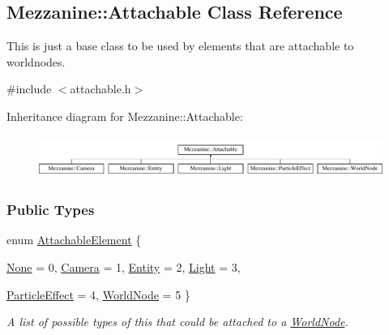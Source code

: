 \hypertarget{classMezzanine_1_1Attachable}{
\subsection{Mezzanine::Attachable Class Reference}
\label{classMezzanine_1_1Attachable}
}


This is just a base class to be used by elements that are attachable to worldnodes.  




{\ttfamily \#include $<$attachable.h$>$}

Inheritance diagram for Mezzanine::Attachable:\begin{figure}[H]
\begin{center}
\leavevmode
\includegraphics[height=1.374233cm]{classMezzanine_1_1Attachable}
\end{center}
\end{figure}
\subsubsection*{Public Types}
\begin{DoxyCompactItemize}
\item 
enum \hyperlink{classMezzanine_1_1Attachable_a274bd45f9666f6e50f6fdd8a0162bc9e}{AttachableElement} \{ \par
\hyperlink{classMezzanine_1_1Attachable_a274bd45f9666f6e50f6fdd8a0162bc9ea7bdda11851ee5269f96ed56c1759de24}{None} =  0, 
\hyperlink{classMezzanine_1_1Attachable_a274bd45f9666f6e50f6fdd8a0162bc9ea6f00000af91736e964c4e9c5ef4089b0}{Camera} =  1, 
\hyperlink{classMezzanine_1_1Attachable_a274bd45f9666f6e50f6fdd8a0162bc9ea0879ad765016bddb95723e99b1526cf4}{Entity} =  2, 
\hyperlink{classMezzanine_1_1Attachable_a274bd45f9666f6e50f6fdd8a0162bc9ea1e169d7d694a091e31c6b59f18841e16}{Light} =  3, 
\par
\hyperlink{classMezzanine_1_1Attachable_a274bd45f9666f6e50f6fdd8a0162bc9ea34203e4c067e9f503fcf9d90a4171397}{ParticleEffect} =  4, 
\hyperlink{classMezzanine_1_1Attachable_a274bd45f9666f6e50f6fdd8a0162bc9ea36319b21c1d23deab66b05906108b306}{WorldNode} =  5
 \}
\begin{DoxyCompactList}\small\item\em A list of possible types of this that could be attached to a \hyperlink{classMezzanine_1_1WorldNode}{WorldNode}. \item\end{DoxyCompactList}\end{DoxyCompactItemize}
